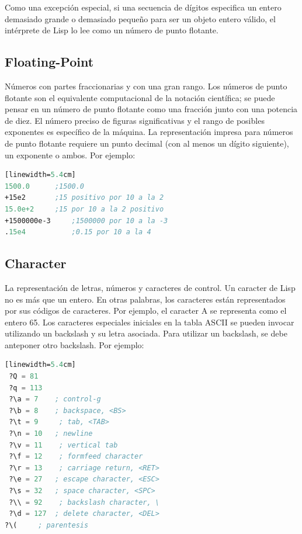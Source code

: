 \documentclass[10pt,journal,compsoc]{IEEEtran}
\begin{document}
Como una excepci\'on especial, si una secuencia de d\'igitos especifica un entero demasiado grande o demasiado peque\~no para ser un objeto entero v\'alido, el int\'erprete de Lisp lo lee como un n\'umero de punto flotante.

\subsection{Floating-Point}
N\'umeros con partes fraccionarias y con una gran rango. Los n\'umeros de punto flotante son el equivalente computacional de la notaci\'on cient\'ifica; se puede pensar en un n\'umero de punto flotante como una fracci\'on junto con una potencia de diez. El n\'umero preciso de figuras significativas y el rango de posibles exponentes es espec\'ifico de la m\'aquina. La representaci\'on impresa para n\'umeros de punto flotante requiere un punto decimal (con al menos un d\'igito siguiente), un exponente o ambos. Por ejemplo: 

\begin{lstlisting}[language=Lisp, caption = {Maneras de representar el valor 1500 en punto flotante}][linewidth=5.4cm]
1500.0  	;1500.0
+15e2  		;15 positivo por 10 a la 2
15.0e+2 	;15 por 10 a la 2 positivo
+1500000e-3     ;1500000 por 10 a la -3
.15e4         	;0.15 por 10 a la 4
\end{lstlisting}

\subsection{Character}
La representaci\'on de letras, n\'umeros y caracteres de control. Un caracter de Lisp no es m\'as que un entero. En otras palabras, los caracteres est\'an representados por sus c\'odigos de caracteres. Por ejemplo, el caracter A se representa como el entero 65. Los caracteres especiales iniciales en la tabla ASCII se pueden invocar utilizando un backslash y su letra asociada. Para utilizar un backslash, se debe anteponer otro backslash. Por ejemplo: \\

\begin{lstlisting}[language=Lisp, caption = {Representaci\'on de caracteres}][linewidth=5.4cm]
 ?Q = 81     
 ?q = 113
 ?\a = 7	; control-g
 ?\b = 8  	; backspace, <BS>
 ?\t = 9   	 ; tab, <TAB>
 ?\n = 10  	; newline
 ?\v = 11    ; vertical tab
 ?\f = 12  	 ; formfeed character
 ?\r = 13  	 ; carriage return, <RET>
 ?\e = 27  	; escape character, <ESC>
 ?\s = 32 	; space character, <SPC>
 ?\\ = 92  	 ; backslash character, \
 ?\d = 127  ; delete character, <DEL>
?\( 	; parentesis
\end{lstlisting}
\end{document}
